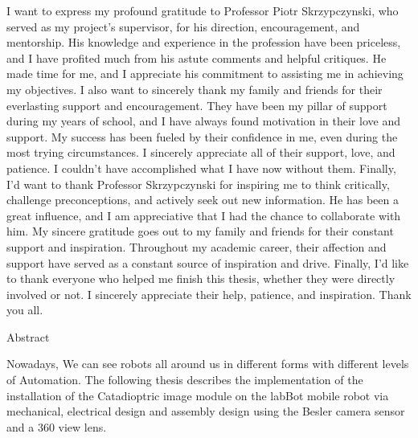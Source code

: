 \documentclass[11pt, a4paper, openany]{book}
\begin{document}
I want to express my profound gratitude to Professor Piotr Skrzypczynski, who served as my project's supervisor, for his direction, encouragement, and mentorship. His knowledge and experience in the profession have been priceless, and I have profited much from his astute comments and helpful critiques. He made time for me, and I appreciate his commitment to assisting me in achieving my objectives.\newline
I also want to sincerely thank my family and friends for their everlasting support and encouragement. They have been my pillar of support during my years of school, and I have always found motivation in their love and support.
My success has been fueled by their confidence in me, even during the most trying circumstances. \newline
I sincerely appreciate all of their support, love, and patience. I couldn't have accomplished what I have now without them.\newline
Finally, I'd want to thank Professor Skrzypczynski for inspiring me to think critically, challenge preconceptions, and actively seek out new information. He has been a great influence, and I am appreciative that I had the chance to collaborate with him.\newline
My sincere gratitude goes out to my family and friends for their constant support and inspiration. Throughout my academic career, their affection and support have served as a constant source of inspiration and drive.
\newline
Finally, I'd like to thank everyone who helped me finish this thesis, whether they were directly involved or not. I sincerely appreciate their help, patience, and inspiration.
\newline
Thank you all.
\newpage
\tableofcontents
\thispagestyle{fancy}
\newpage
\begin{center}
 {\huge Abstract}
\end{center}
Nowadays, We can see robots all around us in different forms with different levels of Automation. The following thesis describes the implementation of the installation of the Catadioptric image module on the labBot mobile robot via mechanical, electrical design and assembly design using the Besler camera sensor and a 360 view lens. 
\end{document}
